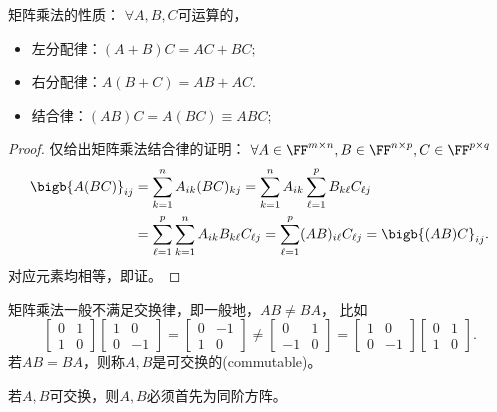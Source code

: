 \begin{corollary}
	矩阵乘法的性质：%
	$\forall A,B,C$可运算的，
    \begin{itemize}
    	\item 左分配律：$(A+B)C=AC+BC;$
    	\item 右分配律：$A(B+C)=AB+AC.$
        \item 结合律：$(AB)C=A(BC)\equiv ABC;$
    \end{itemize}
\end{corollary}

\begin{proof}
	仅给出矩阵乘法结合律的证明：
	$\forall A\in\FF^{m\times n},B\in\FF^{n\times p},C\in\FF^{p\times q}$
	\begin{align*}
		\bigb{A(BC)}_{ij}&=\sum_{k=1}^nA_{ik}(BC)_{kj}=\sum_{k=1}^nA_{ik}\sum_{\ell=1}^pB_{k\ell}C_{\ell j}\\
		&=\sum_{\ell=1}^p\sum_{k=1}^nA_{ik}B_{k\ell}C_{\ell j}=\sum_{\ell=1}^p(AB)_{i\ell}C_{\ell j}=\bigb{(AB)C}_{ij}.
	\end{align*}
	对应元素均相等，即证。
\end{proof}

\begin{remark}
	矩阵乘法一般不满足交换律，即一般地，$AB\neq BA$，
	比如
	\[
		\begin{bmatrix}
			0&1\\1&0
		\end{bmatrix}\begin{bmatrix}
			1&0\\0&-1
		\end{bmatrix}=\begin{bmatrix}
			0&-1\\1&0
		\end{bmatrix}\neq\begin{bmatrix}
			0&1\\-1&0
		\end{bmatrix}=\begin{bmatrix}
			1&0\\0&-1
		\end{bmatrix}\begin{bmatrix}
			0&1\\1&0
		\end{bmatrix}.
	\]
	若$AB=BA$，则称$A,B$是可交换的(commutable)。
\end{remark}

\begin{corollary}
	若$A,B$可交换，则$A,B$必须首先为同阶方阵。
\end{corollary}


